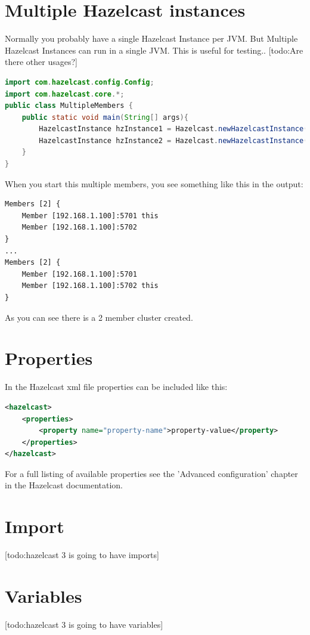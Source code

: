 \section{Multiple Hazelcast instances}
Normally you probably have a single Hazelcast Instance per JVM. But Multiple Hazelcast Instances can run in a single JVM. This is useful for testing.. [todo:Are there other usages?]
\begin{lstlisting}[language=java]
import com.hazelcast.config.Config;
import com.hazelcast.core.*;
public class MultipleMembers {
    public static void main(String[] args){
        HazelcastInstance hzInstance1 = Hazelcast.newHazelcastInstance();
        HazelcastInstance hzInstance2 = Hazelcast.newHazelcastInstance();
    }
}
\end{lstlisting}
When you start this multiple members, you see something like this in the output:
\begin{lstlisting}
Members [2] {
    Member [192.168.1.100]:5701 this
    Member [192.168.1.100]:5702
}
...
Members [2] {
    Member [192.168.1.100]:5701
    Member [192.168.1.100]:5702 this
}
\end{lstlisting}
As you can see there is a 2 member cluster created.

\section{Properties}
In the Hazelcast xml file properties can be included like this:
\begin{lstlisting}[language=xml]
<hazelcast>
    <properties>
        <property name="property-name">property-value</property>
    </properties>
</hazelcast>
\end{lstlisting}
For a full listing of available properties see the 'Advanced configuration' chapter in the Hazelcast documentation.

\section{Import}
[todo:hazelcast 3 is going to have imports]

\section{Variables}
[todo:hazelcast 3 is going to have variables] 

